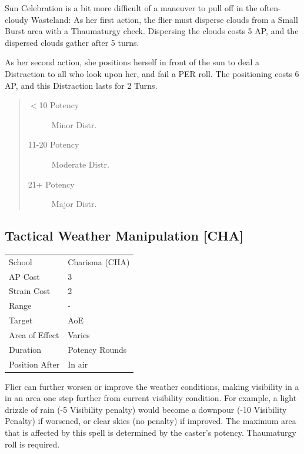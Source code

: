 \documentclass[11pt,a4paper,twocolumn]{book}
\begin{document}
\medskip

Sun Celebration is a bit more difficult of a maneuver to pull off in the often-cloudy Wasteland: As her first action, the flier must disperse clouds from a Small Burst area with a Thaumaturgy check. Dispersing the clouds costs 5 AP, and the dispersed clouds gather after 5 turns.

As her second action, she positions herself in front of the sun to deal a Distraction to all who look upon her, and fail a PER roll. The positioning costs 6 AP, and this Distraction lasts for 2 Turns. 

\begin{quote}
  \begin{description}
    \item[$<$10 Potency] 	Minor Distr.
    \item[11-20 Potency] 	Moderate Distr.
    \item[21+ Potency] 	Major Distr.
  \end{description}
\end{quote}


\subsection*{Tactical Weather Manipulation [CHA]}
{
	\begin{tabu} to 75mm{| X[l,4] | X[l,7] |}
		\hline
		School 			& Charisma (CHA) 	\\
        AP Cost	      	& 3 				\\
        Strain Cost     & 2 				\\
        Range     		& - 				\\
        Target      	& AoE 				\\
        Area of Effect  & Varies 	 		\\
        Duration     	& Potency Rounds	\\
		Position After  & In air 			\\ \hline
	\end{tabu}
		
}

\medskip

Flier can further worsen or improve the weather conditions, making visibility in a in an area one step further from current visibility condition. For example, a light drizzle of rain (-5 Visibility penalty) would become a downpour (-10 Visibility Penalty) if worsened, or clear skies (no penalty) if improved. The maximum area that is affected by this spell is determined by the caster's potency. Thaumaturgy roll is required. 
\end{document}
